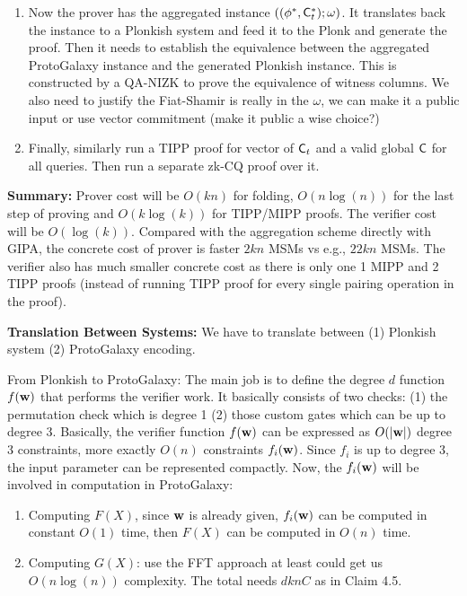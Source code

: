 \begin{enumerate}
  \item Now the prover has the aggregated instance
  $( (\phi^*, {\mathsf{C}}_t^*); \omega)$. It translates back the instance
  to a Plonkish system and feed it to the Plonk and generate the proof.
  Then it needs to establish the equivalence between the aggregated
  ProtoGalaxy instance and the generated Plonkish instance.
  This is constructed by a QA-NIZK to prove the equivalence of
  witness columns. We also need to justify the Fiat-Shamir is
  really in the $\omega$, we can make it a public input or use
  vector commitment (make it public a wise choice?)

  \item Finally, similarly run a TIPP proof for vector of ${\mathsf{C}}_t$ 
  and a valid global ${\mathsf{C}}$ for all queries. Then run a separate
  zk-CQ proof over it.

\end{enumerate}

{\bf Summary:} Prover cost will be $O(kn)$ for folding,
$O(n\log(n))$ for the last step of proving and
$O(k\log(k))$ for TIPP/MIPP proofs. The verifier cost
will be $O(\log(k))$. Compared with the 
aggregation scheme directly with GIPA, the concrete
cost of prover is faster $2kn$ MSMs vs e.g., $22kn$ MSMs.
The verifier also has much smaller concrete cost as
there is only one 1 MIPP and 2 TIPP proofs (instead of
running TIPP proof for every single pairing operation
in the proof).

{\bf Translation Between Systems:} We have to translate
between (1) Plonkish system (2) ProtoGalaxy encoding.

From Plonkish to ProtoGalaxy: The main job is to 
define the degree $d$ function $f({{\mathbf {w}}})$ that
performs the verifier work. It basically consists of
two checks: (1) the permutation check which is degree 1
(2) those custom gates which can be up to degree 3.
Basically, the verifier function $f({{\mathbf {w}}})$
can be expressed as $O(|{{\mathbf {w}}}|)$ degree 3 constraints,
more exactly $O(n)$ constraints $f_i({{\mathbf {w}}})$.
Since $f_i$ is up to degree 3, the input parameter
can be represented compactly. Now, the $f_i({{\mathbf {w}}})$
will be involved in computation in ProtoGalaxy:
\begin{enumerate}
	\item Computing $F(X)$, since ${{\mathbf {w}}}$ is already given,
	$f_i({{\mathbf {w}}})$ can be computed in constant $O(1)$ time,
	then $F(X)$ can be computed in $O(n)$ time.

	\item Computing $G(X)$: use the FFT approach at least 
	could get us $O(n\log(n))$ complexity. The total needs
	$dknC$ as in Claim 4.5.
\end{enumerate}

